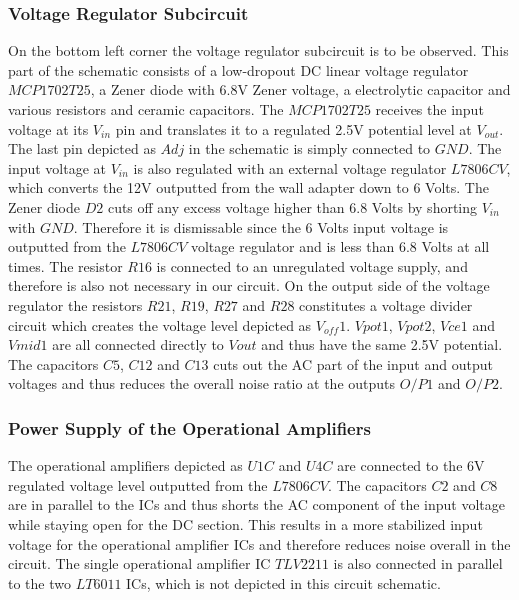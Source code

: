 \subsubsection{Voltage Regulator Subcircuit}
On the bottom left corner the voltage regulator subcircuit is to be observed. This part of the schematic consists of a low-dropout DC linear voltage regulator $MCP1702T25$, a Zener diode with 6.8V Zener voltage, a electrolytic capacitor and various resistors and ceramic capacitors. The $MCP1702T25$ receives the input voltage at its $V_{in}$ pin and translates it to a regulated 2.5V potential level at $V_{out}$. The last pin depicted as $Adj$ in the schematic is simply connected to $GND$. The input voltage at $V_{in}$ is also regulated with an external voltage regulator $L7806CV$, which converts the 12V outputted from the wall adapter down to 6 Volts. The Zener diode $D2$ cuts off any excess voltage higher than 6.8 Volts by shorting $V_{in}$ with $GND$. Therefore it is dismissable since the 6 Volts input voltage is outputted from the $L7806CV$ voltage regulator and is less than 6.8 Volts at all times. The resistor $R16$ is connected to an unregulated voltage supply, and therefore is also not necessary in our circuit. On the output side of the voltage regulator the resistors $R21$, $R19$, $R27$ and $R28$ constitutes a voltage divider circuit which creates the voltage level depicted as $V_{off}1$. $V{pot}1$, $V{pot}2$, $V{ce}1$ and $V{mid}1$ are all connected directly to $V{out}$ and thus have the same 2.5V potential. The capacitors $C5$, $C12$ and $C13$ cuts out the AC part of the input and output voltages and thus reduces the overall noise ratio at the outputs $O/P1$ and $O/P2$.

\subsubsection{Power Supply of the Operational Amplifiers}

The operational amplifiers depicted as $U1C$ and $U4C$ are connected to the 6V regulated voltage level outputted from the $L7806CV$. The capacitors $C2$ and $C8$ are in parallel to the ICs and thus shorts the AC component of the input voltage while staying open for the DC section. This results in a more stabilized input voltage for the operational amplifier ICs and therefore reduces noise overall in the circuit. The single operational amplifier IC $TLV2211$ is also connected in parallel to the two $LT6011$ ICs, which is not depicted in this circuit schematic.

